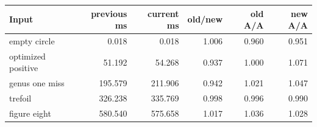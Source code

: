\begin{center}
\small
\begin{tabular}{lrrrrr}
\toprule
Input & previous ms & current ms & old/new & old A/A & new A/A\\
\midrule
empty circle & 0.018 & 0.018 & 1.006 & 0.960 & 0.951\\
optimized positive & 51.192 & 54.268 & 0.937 & 1.000 & 1.071\\
genus one miss & 195.579 & 211.906 & 0.942 & 1.021 & 1.047\\
trefoil & 326.238 & 335.769 & 0.998 & 0.996 & 0.990\\
figure eight & 580.540 & 575.658 & 1.017 & 1.036 & 1.028\\
\bottomrule
\end{tabular}
\end{center}
